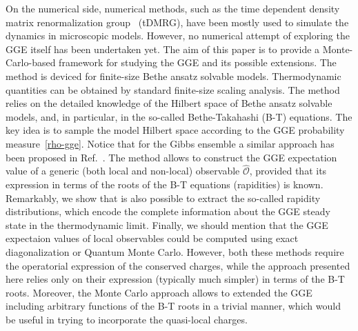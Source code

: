 \documentclass[twocolumn,superscriptaddress,prb,10pt]{revtex4-1}
\begin{document}
On the numerical side, numerical methods, such as the time dependent density 
matrix renormalization group~\cite{white-2004,daley-2004} (tDMRG), have been mostly 
used to simulate the dynamics in microscopic models. However, no numerical attempt 
of exploring the GGE itself has been undertaken yet. The aim of this paper is to 
provide a Monte-Carlo-based framework for studying  the GGE and its possible extensions. 
The method is deviced for finite-size Bethe ansatz solvable models. Thermodynamic 
quantities can be obtained by standard finite-size scaling analysis.  
The method relies on the detailed knowledge of the Hilbert space of Bethe ansatz 
solvable models, and, in particular, in the so-called Bethe-Takahashi (B-T) equations. 
The key idea is to sample the model Hilbert space according to the GGE probability 
measure~\eqref{rho-gge}. Notice that for the Gibbs ensemble a similar approach has 
been proposed in Ref.~.
The method allows to construct the GGE expectation value of a generic (both local 
and non-local) observable $\hat {\mathcal O}$, provided that its expression in terms 
of the roots of the B-T equations (rapidities) is known. Remarkably, we show that is 
also possible to extract the so-called rapidity distributions, which encode the 
complete information about the GGE steady state in the thermodynamic limit. 
Finally, we should mention that the GGE expectaion values of local observables 
could be computed using exact diagonalization or Quantum Monte Carlo. However, 
both these methods require the operatorial expression of the conserved charges, 
while the approach presented here relies only on their expression (typically much 
simpler) in terms of the B-T roots. Moreover, the Monte Carlo approach allows  
to extended the GGE including arbitrary functions of the B-T roots in a trivial 
manner, which would be useful in trying to incorporate the quasi-local charges.   
\end{document}
